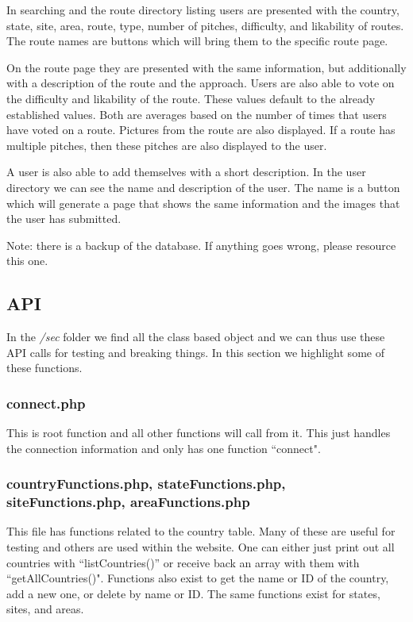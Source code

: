 \documentclass[12pt,letter]{article}
\begin{document}
In searching and the route directory listing users are presented with the
country, state, site, area, route, type, number of pitches, difficulty, and
likability of routes. The route names are buttons which will bring them to the
specific route page. 

On the route page they are presented with the same information, but additionally
with a description of the route and the approach. Users are also able to vote on
the difficulty and likability of the route. These values default to the already
established values. Both are averages based on the number of times that users
have voted on a route. Pictures from the route are also displayed. If a route
has multiple pitches, then these pitches are also displayed to the user.

A user is also able to add themselves with a short description. In the user
directory we can see the name and description of the user. The name is a button
which will generate a page that shows the same information and the images that
the user has submitted.

Note: there is a backup of the database. If anything goes wrong, please resource
this one.

\subsection{API}
In the \textit{/sec} folder we find all the class based object and we can thus
use these API calls for testing and breaking things. In this section we
highlight some of these functions.

\subsubsection{connect.php}
This is root function and all other functions will call from it. This just
handles the connection information and only has one function ``connect".

\subsubsection{countryFunctions.php, stateFunctions.php, siteFunctions.php,
areaFunctions.php}
This file has functions related to the country table. Many of these are useful
for testing and others are used within the website. One can either just print
out all countries with ``listCountries()'' or receive back an array with them
with ``getAllCountries()". Functions also exist to get the name or ID of the
country, add a new one, or delete by name or ID. The same functions exist for
states, sites, and areas. 
\end{document}

